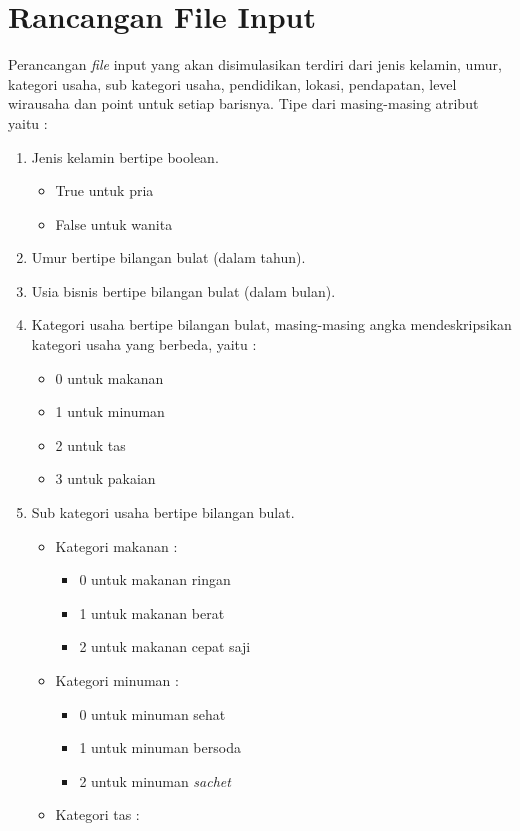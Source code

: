 \section{Rancangan File Input}
\label{rancanganFile}
Perancangan \textit{file} input yang akan disimulasikan terdiri dari jenis kelamin, umur, kategori usaha, sub kategori usaha, pendidikan, lokasi, pendapatan, level wirausaha dan point untuk setiap barisnya.
Tipe dari masing-masing atribut yaitu :
\begin{enumerate}
	\item Jenis kelamin bertipe boolean.
	\begin{itemize}
		\item True untuk pria
		\item False untuk wanita
	\end{itemize}
	\item Umur bertipe bilangan bulat (dalam tahun).
	\item Usia bisnis bertipe bilangan bulat (dalam bulan).
	\item Kategori usaha bertipe bilangan bulat, masing-masing angka mendeskripsikan kategori usaha yang berbeda, yaitu :
		\begin{itemize}
			\item 0 untuk makanan
			\item 1 untuk minuman
			\item 2 untuk tas
			\item 3 untuk pakaian
		\end{itemize}
	\item Sub kategori usaha bertipe bilangan bulat.
		\begin{itemize}
			\item Kategori makanan :
				\begin{itemize}
					\item 0 untuk makanan ringan
					\item 1 untuk makanan berat
					\item 2 untuk makanan cepat saji
				\end{itemize}
			\item Kategori minuman :
				\begin{itemize}
					\item 0 untuk minuman sehat
					\item 1 untuk minuman bersoda
					\item 2 untuk minuman \textit{sachet}
				\end{itemize}
			\item Kategori tas :
				\begin{itemize}

\end{itemize}
\end{itemize}
\end{enumerate}
